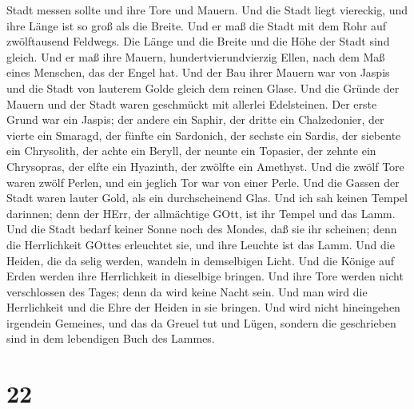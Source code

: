 Stadt messen sollte und ihre Tore und Mauern.  Und die
Stadt liegt viereckig, und ihre Länge ist so groß als die Breite. Und er
maß die Stadt mit dem Rohr auf zwölftausend Feldwegs. Die Länge und die
Breite und die Höhe der Stadt sind gleich.  Und er maß ihre
Mauern, hundertvierundvierzig Ellen, nach dem Maß eines Menschen, das
der Engel hat.  Und der Bau ihrer Mauern war von Jaspis und
die Stadt von lauterem Golde gleich dem reinen Glase.  Und
die Gründe der Mauern und der Stadt waren geschmückt mit allerlei
Edelsteinen. Der erste Grund war ein Jaspis; der andere ein Saphir, der
dritte ein Chalzedonier, der vierte ein Smaragd,  der
fünfte ein Sardonich, der sechste ein Sardis, der siebente ein
Chrysolith, der achte ein Beryll, der neunte ein Topasier, der zehnte
ein Chrysopras, der elfte ein Hyazinth, der zwölfte ein Amethyst.
 Und die zwölf Tore waren zwölf Perlen, und ein jeglich Tor
war von einer Perle. Und die Gassen der Stadt waren lauter Gold, als ein
durchscheinend Glas.  Und ich sah keinen Tempel darinnen;
denn der HErr, der allmächtige GOtt, ist ihr Tempel und das Lamm.
 Und die Stadt bedarf keiner Sonne noch des Mondes, daß sie
ihr scheinen; denn die Herrlichkeit GOttes erleuchtet sie, und ihre
Leuchte ist das Lamm.  Und die Heiden, die da selig werden,
wandeln in demselbigen Licht. Und die Könige auf Erden werden ihre
Herrlichkeit in dieselbige bringen.  Und ihre Tore werden
nicht verschlossen des Tages; denn da wird keine Nacht sein.
 Und man wird die Herrlichkeit und die Ehre der Heiden in
sie bringen.  Und wird nicht hineingehen irgendein
Gemeines, und das da Greuel tut und Lügen, sondern die geschrieben sind
in dem lebendigen Buch des Lammes.

\hypertarget{section-20}{%
\section{22}\label{section-20}}

